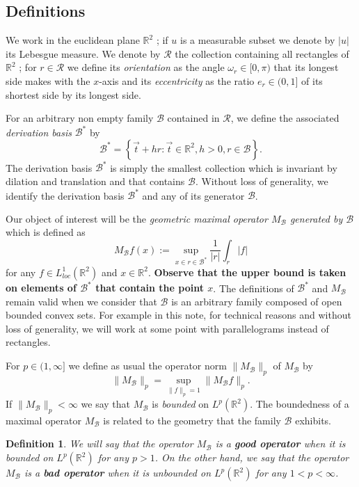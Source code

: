 \documentclass{article}
\newtheorem{defn}[thm]{Definition}
\begin{document}
\subsection*{Definitions}

We work in the euclidean plane $\mathbb{R}^2$ ; if $u$ is a measurable subset we denote by $|u|$ its Lebesgue measure. We denote by $\mathcal{R}$ the collection containing all rectangles of $\mathbb{R}^2$ ; for $r \in \mathcal{R}$ we define its \textit{orientation} as  the angle $\omega_r \in [0,\pi) $ that its longest side makes with the $x$-axis and its \textit{eccentricity} as the ratio $e_r \in (0,1]$ of its shortest side by its longest side.



For an arbitrary non empty family $\mathcal{B}$ contained in $\mathcal{R}$, we define the associated \textit{derivation basis} $\mathcal{B}^*$ by $$\mathcal{B}^* = \left\{ \Vec{t} + h r : \Vec{t} \in \mathbb{R}^2, h>0, r \in \mathcal{B} \right\}.$$ The derivation basis $\mathcal{B}^*$ is simply the smallest collection which is invariant by dilation and translation and that contains $\mathcal{B}$. Without loss of generality, we identify the derivation basis $\mathcal{B}^*$ and any of its generator $\mathcal{B}$.

Our object of interest will be the \textit{geometric maximal operator $M_\mathcal{B}$ generated by $\mathcal{B}$} which is defined as $$M_\mathcal{B}f(x) := \sup_{x \in r \in \mathcal{B}^*}  \frac{1}{|r|} \int_r |f|$$ for any $f \in L_{loc}^{1}(\mathbb{R}^2)$ and $x \in \mathbb{R}^2$. \textbf{Observe that the upper bound is taken on elements of $\mathcal{B}^*$ that contain the point $x$}. The definitions of $\mathcal{B}^*$ and $M_\mathcal{B}$ remain valid when we consider that $\mathcal{B}$ is an arbitrary family composed of open bounded convex sets. For example in this note, for technical reasons and without loss of generality, we will work at some point with parallelograms instead of rectangles.

For $p \in (1, \infty]$ we define as usual the operator norm $\|M_\mathcal{B}\|_p$ of $M_\mathcal{B}$ by $$ \|M_\mathcal{B}\|_p = \sup_{ \|f\|_p = 1} \|M_\mathcal{B}f\|_p.$$ If $\|M_\mathcal{B}\|_p < \infty$ we say that $M_\mathcal{B}$ is \textit{bounded} on $L^p(\mathbb{R}^2)$.  The boundedness of a maximal operator $M_\mathcal{B}$ is related to the geometry that the family $\mathcal{B}$ exhibits. 

\begin{defn}
We will say that the operator $M_\mathcal{B}$ is a \textbf{good operator} when it is bounded on $L^p(\mathbb{R}^2)$ for any $ p > 1$. On the other hand, we say that the operator $M_\mathcal{B}$ is a \textbf{bad operator} when it is unbounded on $L^p(\mathbb{R}^2)$ for any $1 < p < \infty$.
\end{defn}
\end{document}
